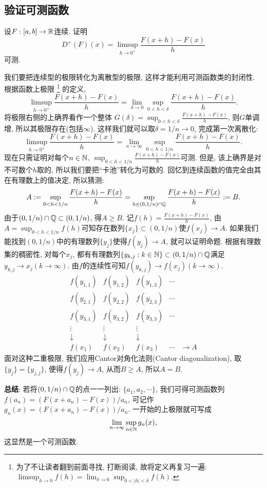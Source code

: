 \subsection{验证可测函数}
\begin{example}[~(Dini导数)] %
    设$F: [a,b] \to \mathbb{R}$连续. 证明
    $$D^+(F)(x) = \limsup_{h \to 0^+}\frac{F(x+h)-F(x)}{h}$$
    可测. 
\end{example}
\begin{solution}
    我们要把连续型的极限转化为离散型的极限, 这样才能利用可测函数类的封闭性. 根据函数上极限
    \footnote{为了不让读者翻到前面寻找, 打断阅读, 故将定义再复习一遍: $\limsup_{h \to 0}f(h) = \lim_{\delta \to  0} \sup_{0<|h|<\delta} f(h)$.}
    的定义,
    $$\limsup_{h \to 0^+}\frac{F(x+h)-F(x)}{h} = 
    \lim_{\delta \to 0}\sup_{0<h<\delta}\frac{F(x+h)-F(x)}{h}.$$
    将极限右侧的上确界看作一个整体
    $\displaystyle{G(\delta)=\sup_{0<h<\delta}\frac{F(x+h)-F(x)}{h} }$, 则$G$单调增, 所以其极限存在(包括$\infty$). 这样我们就可以取$\delta=1/n \to 0$, 完成第一次离散化:
    $$\limsup_{h \to 0^+}\frac{F(x+h)-F(x)}{h} = 
    \lim_{n \to \infty}\sup_{0<h<1/n}\frac{F(x+h)-F(x)}{h}.$$
    现在只需证明对每个$n \in \mathbb{N}$, $\displaystyle{\sup_{0<h<1/n}\frac{F(x+h)-F(x)}{h}}$可测.
    但是, 该上确界是对不可数个$h$取的, 所以我们要把“卡池”转化为可数的. 回忆到连续函数的值完全由其在有理数上的值决定, 所以猜测:
    $$A := \sup_{0<h<1/n}\frac{F(x+h)-F(x)}{h}=\sup_{h \in (0, 1/n) \cap \mathbb{Q}}
    \frac{F(x+h)-F(x)}{h} := B.$$
    由于$(0,1/n)\cap \mathbb{Q} \subset (0, 1/n)$, 得$A \geq B$. 
    记$\displaystyle{f(h)=\frac{F(x+h)-F(x)}{h}}$, 由$A=\sup_{0<h<1/n}f(h)$可知存在数列$\{x_j\} \subset (0,1/n)$使$f(x_j) \to A$. 如果我们能找到$(0,1/n)$中的有理数列$\{y_j\}$使得$f(y_j) \to A$, 就可以证明命题. 根据有理数集的稠密性, 对每个$x_j$, 都有有理数列$\{y_{k,j}:k \in \mathbb{N} \} \subset (0, 1/n) \cap \mathbb{Q}$满足$y_{k,j} \to x_j (k \to \infty)$. 由$f$的连续性可知$f(y_{k,j}) \to f(x_j) (k \to \infty)$. 
    $$\begin{matrix}
        f(y_{1,1}) & f(y_{1,2}) & f(y_{1,3}) & \cdots & \\
        f(y_{2,1}) & f(y_{2,2}) & f(y_{2,3}) & \cdots & \\
        f(y_{3,1}) & f(y_{3,2}) & f(y_{3,3}) & \cdots & \\
        \vdots  & \vdots  & \vdots  &  \\
        \downarrow & \downarrow & \downarrow &  \\
        f(x_1)     & f(x_2)     & f(x_3)     & \cdots & \to A
    \end{matrix}$$
    面对这种二重极限, 我们应用Cantor对角化法则(Cantor diagonalization), 取$\{y_j\}=\{y_{j,j}\}$, 便得$f(y_{j}) \to A$, 从而$B\geq A$, 所以$A=B$. 
\end{solution}
\textbf{总结}: 
    若将$(0,1/n) \cap \mathbb{Q}$的点一一列出: $\{a_1, a_2, \cdots\}$, 我们可得可测函数列
    $f(a_n)=(F(x+a_n)-F(x))/a_n$, 可记作$g_n(x)=(F(x+a_n)-F(x))/a_n$. 一开始的上极限就可写成
    $$\lim_{n\to \infty}\sup_{n \in \mathbb{N}} g_n(x),$$
    这显然是一个可测函数. 
    
